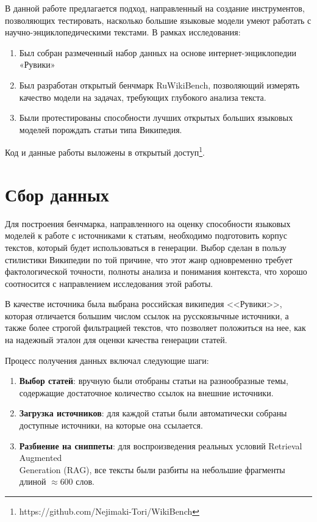 \documentclass{article}
\begin{document}
В данной работе предлагается подход, направленный на создание 
инструментов, позволяющих тестировать, насколько большие языковые модели умеют работать с научно-энциклопедическими текстами.
В рамках исследования:
\begin{enumerate}

    \item Был собран размеченный набор данных на основе интернет-энциклопедии «Рувики»
    
    \item Был разработан открытый бенчмарк RuWikiBench, позволяющий измерять качество модели на задачах, требующих глубокого анализа текста.
    
    \item Были протестированы способности лучших открытых больших языковых моделей порождать статьи типа Википедия.

\end{enumerate}

Код и данные работы выложены в открытый доступ\footnote{https://github.com/Nejimaki-Tori/WikiBench}.

\section*{Сбор данных}

Для построения бенчмарка, направленного на оценку способности языковых моделей к работе с источниками к статьям, необходимо подготовить корпус текстов, который будет использоваться в генерации. 
Выбор сделан в пользу стилистики Википедии по той причине, что этот жанр одновременно требует фактологической точности, полноты анализа и понимания контекста, что хорошо соотносится с направлением исследования этой работы.

В качестве источника была выбрана российская википедия <<Рувики>>, которая отличается большим числом ссылок на русскоязычные источники, а также более строгой фильтрацией текстов, 
что позволяет положиться на нее, как на надежный эталон для оценки качества генерации статей.

Процесс получения данных включал следующие шаги:

\begin{enumerate}

    \item \textbf{Выбор статей}: вручную были отобраны статьи на разнообразные темы, 
    содержащие достаточное количество ссылок на внешние источники.
    
    \item \textbf{Загрузка источников}: для каждой статьи были автоматически собраны доступные источники, на которые она ссылается. 
    
    \item \textbf{Разбиение на сниппеты}: для воспроизведения реальных условий Retrieval Augmented \\Generation (RAG), 
    все тексты были разбиты на небольшие фрагменты длиной $\approx 600$ слов.

\end{enumerate}
\end{document}
